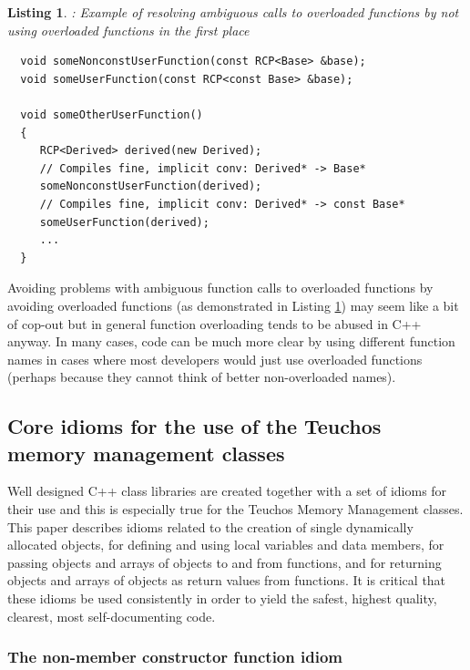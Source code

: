 \documentclass[pdf,ps2pdf,11pt]{SANDreport}
\newtheorem{listing}{Listing}
\begin{document}
{}\begin{listing}: Example of resolving ambiguous calls to overloaded
functions by not using overloaded functions in the first place
\label{listing:overloaded-func-implicit-conv-nonoverload}
{\small\begin{verbatim}
  void someNonconstUserFunction(const RCP<Base> &base);
  void someUserFunction(const RCP<const Base> &base);

  void someOtherUserFunction()
  {
     RCP<Derived> derived(new Derived);
     // Compiles fine, implicit conv: Derived* -> Base*
     someNonconstUserFunction(derived);
     // Compiles fine, implicit conv: Derived* -> const Base*
     someUserFunction(derived);
     ...
  }
\end{verbatim}}
\end{listing}


Avoiding problems with ambiguous function calls to overloaded
functions by avoiding overloaded functions (as demonstrated in Listing
{}\ref{listing:overloaded-func-implicit-conv-nonoverload}) may seem
like a bit of cop-out but in general function overloading tends to be
abused in C++ anyway.  In many cases, code can be much more clear by
using different function names in cases where most developers would
just use overloaded functions (perhaps because they cannot think of
better non-overloaded names).


%
{}\subsection{Core idioms for the use of the Teuchos memory management
classes}
\label{sec:idioms}
%

Well designed C++ class libraries are created together with a set of
idioms for their use and this is especially true for the Teuchos
Memory Management classes.  This paper describes idioms related to the
creation of single dynamically allocated objects, for defining and
using local variables and data members, for passing objects and arrays
of objects to and from functions, and for returning objects and arrays
of objects as return values from functions.  It is critical that these
idioms be used consistently in order to yield the safest, highest
quality, clearest, most self-documenting code.


%
{}\subsubsection{The non-member constructor function idiom}
\label{sec:nonmember-constructor-idiom}
%
\end{document}
